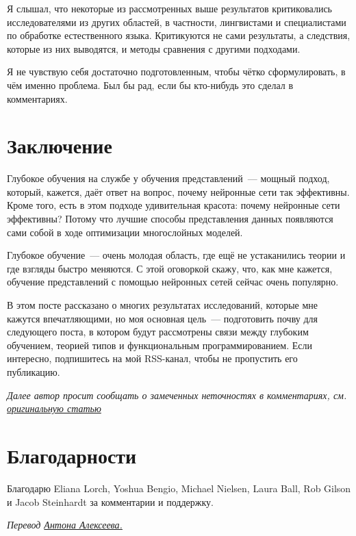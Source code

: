 \documentclass[a4paper,12pt]{article}
\begin{document}
Я слышал, что некоторые из рассмотренных выше результатов критиковались исследователями из других областей, в частности, лингвистами и специалистами по обработке естественного языка. Критикуются не сами результаты, а следствия, которые из них выводятся, и методы сравнения с другими подходами.

Я не чувствую себя достаточно подготовленным, чтобы чётко сформулировать, в чём именно проблема. Был бы рад, если бы кто-нибудь это сделал в комментариях.

\section*{Заключение}

Глубокое обучения на службе у обучения представлений~--- мощный подход, который, кажется, даёт ответ на вопрос, почему нейронные сети так эффективны. Кроме того, есть в этом подходе удивительная красота: почему нейронные сети эффективны? Потому что лучшие способы представления данных появляются сами собой в ходе оптимизации многослойных моделей.

Глубокое обучение~--- очень молодая область, где ещё не устаканились теории и где взгляды быстро меняются. С этой оговоркой скажу, что, как мне кажется, обучение представлений с помощью нейронных сетей сейчас очень популярно.

В этом посте рассказано о многих результатах исследований, которые мне кажутся впечатляющими, но моя основная цель~--- подготовить почву для следующего поста, в котором будут рассмотрены связи между глубоким обучением, теорией типов и функциональным программированием. Если интересно, подпишитесь на мой RSS-канал, чтобы не пропустить его публикацию.
 
{\it Далее автор просит сообщать о замеченных неточностях в комментариях, см. \href{http://colah.github.io/posts/2014-07-NLP-RNNs-Representations/}{оригинальную статью}} 
 
\section*{Благодарности}

Благодарю Eliana Lorch, Yoshua Bengio, Michael Nielsen, Laura Ball, Rob Gilson и Jacob Steinhardt за комментарии и поддержку.

\bigskip

{\it Перевод \href{http://www.stachek66.ru}{Антона Алексеева.}}

\end{document}
